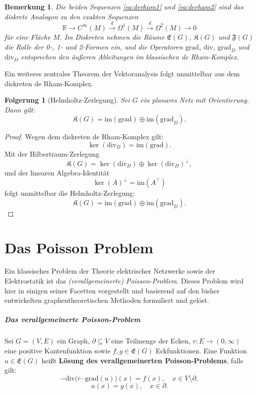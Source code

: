 \documentclass[11pt,a4paper,leqno]{report}
\newtheorem{corollary}[theorem]{Folgerung}
\newtheorem{remark}[theorem]{Bemerkung}
\numberwithin{equation}{chapter}
\begin{document}
\begin{remark}
	Die beiden Sequenzen \eqref{eq:derham1} und \eqref{eq:derham2} 
	sind das diskrete Analogon zu den exakten Sequenzen
	\[
	\mathbb{R}\to C^\infty(M)\xrightarrow{d}\Omega^1(M)\xrightarrow{d}\Omega^2(M)\to 0
	\]
	für eine Fläche $M$.  
	Im Diskreten nehmen die Räume $\mathfrak{E}(G)$, $\mathfrak{K}(G)$ und $\mathfrak{F}(G)$ 
	die Rolle der 0‑, 1‑ und 2‑Formen ein, und die Operatoren 
	$\mathrm{grad}$, $\mathrm{div}$, $\mathrm{grad}_D$ und $\mathrm{div}_D$ 
	entsprechen den äußeren Ableitungen im klassischen de Rham-Komplex.
\end{remark}
\noindent
Ein weiteres zentrales Theorem der Vektoranalysis folgt unmittelbar aus dem diskreten de Rham-Komplex.
\begin{corollary}[Helmholtz-Zerlegung]
	Sei \(G\) ein planares Netz mit Orientierung. Dann gilt:
	\[
	\mathfrak{K}(G) = \mathrm{im}(\mathrm{grad}) \oplus \mathrm{im}(\mathrm{grad}_D).
	\]
\end{corollary}
\begin{proof}
	Wegen dem diskreten de Rham-Komplex gilt:
	\[
	\ker(\mathrm{div}_D) = \mathrm{im}(\mathrm{grad}).
	\]
	Mit der Hilbertraum-Zerlegung
	\[
	\mathfrak{K}(G) = \ker(\mathrm{div}_D) \oplus \ker(\mathrm{div}_D)^\perp,
	\]
	und der linearen Algebra-Identität
	\[
	\ker(A)^\perp = \mathrm{im}(A^\top)
	\]
	folgt unmittelbar die Helmholtz-Zerlegung:
	\[
	\mathfrak{K}(G) = \mathrm{im}(\mathrm{grad}) \oplus \mathrm{im}(\mathrm{grad}_D).
	\]
\end{proof}
\chapter{Das Poisson Problem}
Ein klassisches Problem der Theorie elektrischer Netzwerke sowie der Elektrostatik ist das \emph{(verallgemeinerte) Poisson-Problem}. 
Dieses Problem wird hier in einigen seiner Facetten vorgestellt und basierend auf den bisher entwickelten graphentheoretischen Methoden formuliert und gelöst.

\paragraph{Das verallgemeinerte Poisson-Problem}
Sei $G=(V,E)$ ein Graph, $\partial \subseteq V$ eine Teilmenge der Ecken, 
$r:E \to (0,\infty)$ eine positive Kantenfunktion 
sowie $f,g\in \mathfrak{E}(G)$ Eckfunktionen. 
Eine Funktion $u\in \mathfrak{E}(G)$ heißt \textbf{Lösung des verallgemeinerten Poisson-Problems}, falls gilt:
\begin{equation}
	-\mathrm{div}\!\bigl(r \cdot \mathrm{grad}(u)\bigr)(x) = f(x), \quad x \in V\setminus\partial,
\end{equation}
\begin{equation}
	u(x) = g(x), \quad x \in \partial.
\end{equation}
\end{document}
